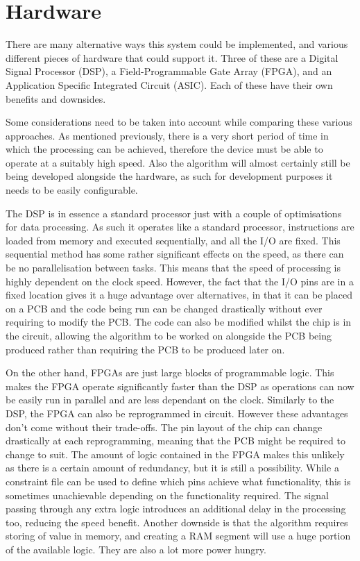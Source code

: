 \section{Hardware}
There are many alternative ways this system could be implemented, and various different pieces of hardware that could support it.
Three of these are a Digital Signal Processor (DSP), a Field-Programmable Gate Array (FPGA), and an Application Specific Integrated Circuit (ASIC).
Each of these have their own benefits and downsides.

Some considerations need to be taken into account while comparing these various approaches.
As mentioned previously, there is a very short period of time in which the processing can be achieved, therefore the device must be able to operate at a suitably high speed.
Also the algorithm will almost certainly still be being developed alongside the hardware, as such for development purposes it needs to be easily configurable.

The DSP is in essence a standard processor just with a couple of optimisations for data processing.
As such it operates like a standard processor, instructions are loaded from memory and executed sequentially, and all the I/O are fixed.
This sequential method has some rather significant effects on the speed, as there can be no parallelisation between tasks.
This means that the speed of processing is highly dependent on the clock speed.
However, the fact that the I/O pins are in a fixed location gives it a huge advantage over alternatives, in that it can be placed on a PCB and the code being run can be changed drastically without ever requiring to modify the PCB.
The code can also be modified whilst the chip is in the circuit, allowing the algorithm to be worked on alongside the PCB being produced rather than requiring the PCB to be produced later on.

On the other hand, FPGAs are just large blocks of programmable logic.
This makes the FPGA operate significantly faster than the DSP as operations can now be easily run in parallel and are less dependant on the clock.
Similarly to the DSP, the FPGA can also be reprogrammed in circuit.
However these advantages don't come without their trade-offs.
The pin layout of the chip can change drastically at each reprogramming, meaning that the PCB might be required to change to suit.
The amount of logic contained in the FPGA makes this unlikely as there is a certain amount of redundancy, but it is still a possibility.
While a constraint file can be used to define which pins achieve what functionality, this is sometimes unachievable depending on the functionality required.
The signal passing through any extra logic introduces an additional delay in the processing too, reducing the speed benefit.
Another downside is that the algorithm requires storing of value in memory, and creating a RAM segment will use a huge portion of the available logic.
They are also a lot more power hungry.

